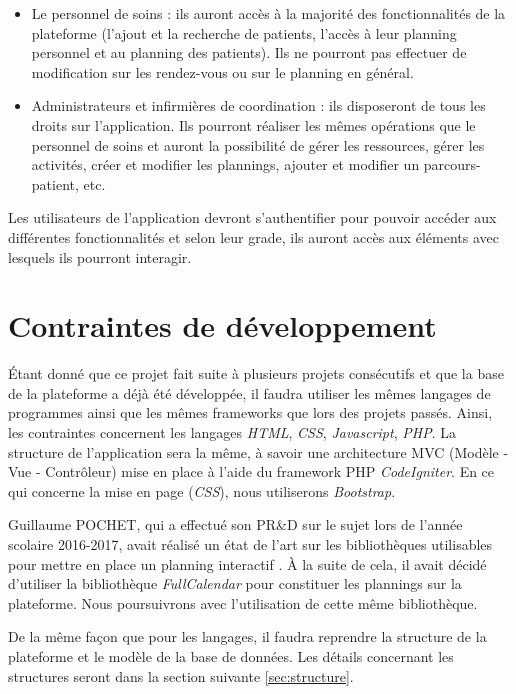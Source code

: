 \documentclass[noposter]{polytech/polytech}
\begin{document}
\begin{itemize}
	\item Le personnel de soins : ils auront accès à la majorité des fonctionnalités de la plateforme (l'ajout et la recherche de patients, l'accès à leur planning personnel et au planning des patients). Ils ne pourront pas effectuer de modification sur les rendez-vous ou sur le planning en général.
	\item Administrateurs et infirmières de coordination : ils disposeront de tous les droits sur l'application. Ils pourront réaliser les mêmes opérations que le personnel de soins et auront la possibilité de gérer les ressources, gérer les activités, créer et modifier les plannings, ajouter et modifier un parcours-patient, etc.
\end{itemize}

Les utilisateurs de l'application devront s'authentifier pour pouvoir accéder aux différentes fonctionnalités et selon leur grade, ils auront accès aux éléments avec lesquels ils pourront interagir. 


\section{Contraintes de développement}

\'{E}tant donné que ce projet fait suite à plusieurs projets consécutifs et que la base de la plateforme a déjà été développée, il faudra utiliser les mêmes langages de programmes ainsi que les mêmes frameworks que lors des projets passés. Ainsi, les contraintes concernent les langages \textit{HTML}, \textit{CSS}, \textit{Javascript}, \textit{PHP}. La structure de l'application sera la même, à savoir une architecture MVC (Modèle - Vue - Contrôleur) mise en place à l'aide du framework PHP \textit{CodeIgniter}. En ce qui concerne la mise en page (\textit{CSS}), nous utiliserons \textit{Bootstrap}.

Guillaume POCHET, qui a effectué son PR\&D sur le sujet lors de l'année scolaire 2016-2017, avait réalisé un état de l'art sur les bibliothèques utilisables pour mettre en place un planning interactif \cite{pochet_outil_nodate}. À la suite de cela, il avait décidé d'utiliser la bibliothèque \textit{FullCalendar} pour constituer les plannings sur la plateforme. Nous poursuivrons avec l'utilisation de cette même bibliothèque.

De la même façon que pour les langages, il faudra reprendre la structure de la plateforme et le modèle de la base de données. Les détails concernant les structures seront dans la section suivante \autoref{sec:structure}.
\end{document}
